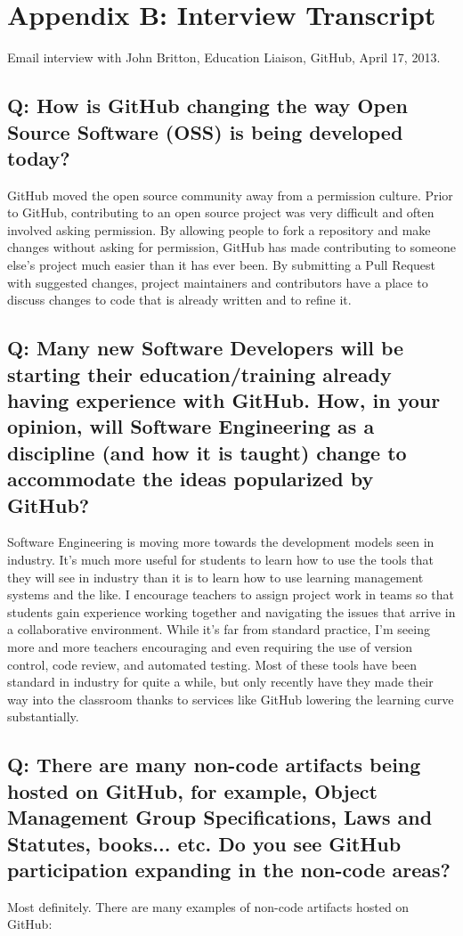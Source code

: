 \clearpage

\section*{Appendix B: Interview Transcript}
Email interview with John Britton, Education Liaison, GitHub, April 17, 2013.

\subsection*{Q: How is GitHub changing the way Open Source Software (OSS) is being developed today?}
GitHub moved the open source community away from a permission culture. Prior to GitHub, contributing to an open source project was very difficult and often involved asking permission. By allowing people to fork a repository and make changes without asking for permission, GitHub has made contributing to someone else's project much easier than it has ever been. By submitting a Pull Request with suggested changes, project maintainers and contributors have a place to discuss changes to code that is already written and to refine it.

\subsection*{Q: Many new Software Developers will be starting their education/training already having experience with GitHub. How, in your opinion, will Software Engineering as a discipline (and how it is taught) change to accommodate the ideas popularized by GitHub?}

Software Engineering is moving more towards the development models seen in industry. It's much more useful for students to learn how to use the tools that they will see in industry than it is to learn how to use learning management systems and the like. I encourage teachers to assign project work in teams so that students gain experience working together and navigating the issues that arrive in a collaborative environment. While it's far from standard practice, I'm seeing more and more teachers encouraging and even requiring the use of version control, code review, and automated testing. Most of these tools have been standard in industry for quite a while, but only recently have they made their way into the classroom thanks to services like GitHub lowering the learning curve substantially.

\subsection*{Q: There are many non-code artifacts being hosted on GitHub, for example, Object Management Group Specifications, Laws and Statutes, books... etc. Do you see GitHub participation expanding in the non-code areas?}
Most definitely. There are many examples of non-code artifacts hosted on GitHub:

